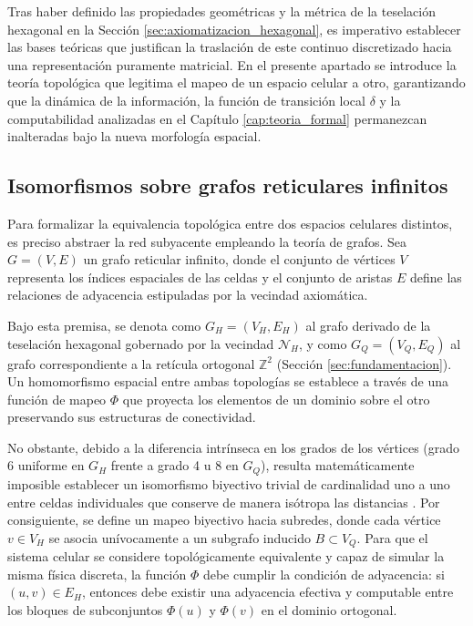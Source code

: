 Tras haber definido las propiedades geométricas y la métrica de la teselación hexagonal en la Sección \ref{sec:axiomatizacion_hexagonal}, es imperativo establecer las bases teóricas que justifican la traslación de este continuo discretizado hacia una representación puramente matricial. En el presente apartado se introduce la teoría topológica que legitima el mapeo de un espacio celular a otro, garantizando que la dinámica de la información, la función de transición local $\delta$ y la computabilidad analizadas en el Capítulo \ref{cap:teoria_formal} permanezcan inalteradas bajo la nueva morfología espacial.

\subsection{Isomorfismos sobre grafos reticulares infinitos}
\label{subsec:isomorfismos_grafos}

Para formalizar la equivalencia topológica entre dos espacios celulares distintos, es preciso abstraer la red subyacente empleando la teoría de grafos. Sea $G = (V, E)$ un grafo reticular infinito, donde el conjunto de vértices $V$ representa los índices espaciales de las celdas y el conjunto de aristas $E$ define las relaciones de adyacencia estipuladas por la vecindad axiomática.

Bajo esta premisa, se denota como $G_H = (V_H, E_H)$ al grafo derivado de la teselación hexagonal gobernado por la vecindad $\mathcal{N}_H$, y como $G_Q = (V_Q, E_Q)$ al grafo correspondiente a la retícula ortogonal $\mathbb{Z}^2$ (Sección \ref{sec:fundamentacion}). Un homomorfismo espacial entre ambas topologías se establece a través de una función de mapeo $\Phi$ que proyecta los elementos de un dominio sobre el otro preservando sus estructuras de conectividad.

No obstante, debido a la diferencia intrínseca en los grados de los vértices (grado 6 uniforme en $G_H$ frente a grado 4 u 8 en $G_Q$), resulta matemáticamente imposible establecer un isomorfismo biyectivo trivial de cardinalidad uno a uno entre celdas individuales que conserve de manera isótropa las distancias \cite{Toffoli1987}. Por consiguiente, se define un mapeo biyectivo hacia subredes, donde cada vértice $v \in V_H$ se asocia unívocamente a un subgrafo inducido $B \subset V_Q$. Para que el sistema celular se considere topológicamente equivalente y capaz de simular la misma física discreta, la función $\Phi$ debe cumplir la condición de adyacencia: si $(u, v) \in E_H$, entonces debe existir una adyacencia efectiva y computable entre los bloques de subconjuntos $\Phi(u)$ y $\Phi(v)$ en el dominio ortogonal.

